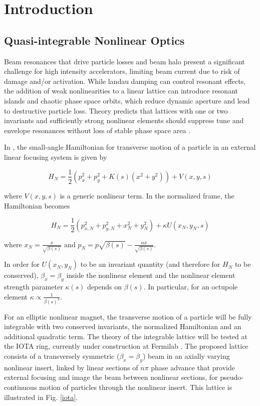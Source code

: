 
\renewcommand{\thechapter}{1}

\chapter{Introduction}

\section{Quasi-integrable Nonlinear Optics}



Beam resonances that drive particle losses and beam halo present a significant challenge for high intensity accelerators, limiting beam current due to risk of damage and/or activation. While landau damping can control resonant effects, the addition of weak nonlinearities to a linear lattice can introduce resonant islands and chaotic phase space orbits, which reduce dynamic aperture and lead to destructive particle loss. Theory predicts that lattices with one or two invariants and sufficiently strong nonlinear elements should suppress tune and envelope resonances without loss of stable phase space area \cite{DN}. 

In \cite{DN}, the small-angle Hamiltonian for transverse motion of a particle in an external linear focusing system is given by 

\begin{equation}
H_N = \frac{1}{2} \left( p_{x}^2 + p_{y}^2 + K(s) \left(x^2 + y^2 \right) \right) + V(x,y,s)
\end{equation}

where $V(x,y,s)$ is a generic nonlinear term. In the normalized frame, the Hamiltonian becomes 

\begin{equation}
H_N = \frac{1}{2} \left( p_{x,N}^2 + p_{y,N}^2 +x_N^2 + y_N^2 \right) + \kappa U(x_N,y_N,s)
\end{equation}

where $x_N = \frac{x}{\sqrt{\beta(s)}}$ and $p_N = p\sqrt{\beta(s)}-\frac{\alpha x}{\sqrt{\beta(s)}}$. 

In order for $U(x_N,y_N)$ to be an invariant quantity (and therefore for $H_N$ to be conserved), $\beta_x=\beta_y$ inside the nonlinear element and the nonlinear element strength parameter $\kappa (s)$ depends on $\beta (s)$. In particular, for an octupole element $\kappa \propto \frac{1}{\beta(s)^3}$.

For an elliptic nonlinear magnet, the transverse motion of a particle will be fully integrable with two conserved invariants, the normalized Hamiltonian and an additional quadratic term. The theory of the integrable lattice will be tested at the IOTA ring, currently under construction at Fermilab \cite{ipac12,antipov}. The proposed lattice consists of a transversely symmetric ($\beta_x = \beta_y$) beam in an axially varying nonlinear insert, linked by linear sections of $n\pi$ phase advance that provide external focusing and image the beam between nonlinear sections, for pseudo-continuous motion of particles through the nonlinear insert. This lattice is illustrated in Fig. \ref{iota}.

